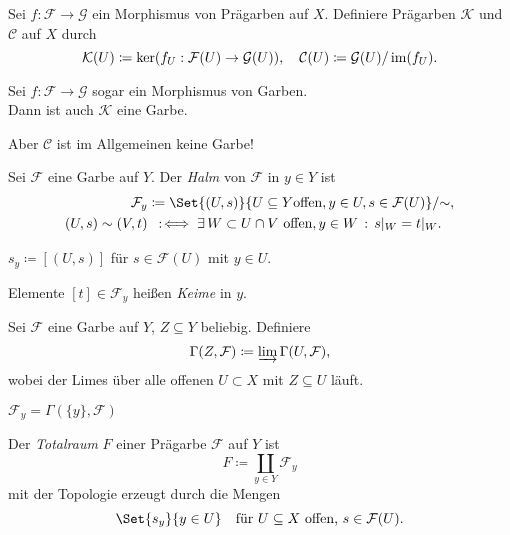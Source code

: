 \documentclass{cheat-sheet}
\newcommand{\Fais}{\mathcal{F}} %
\newcommand{\Garb}{\mathcal{G}} %
\begin{document}
\begin{defn}
  Sei $f : \Fais \to \Garb$ ein Morphismus von Prägarben auf $X$. Definiere Prägarben $\mathcal{K}$ und $\mathcal{C}$ auf $X$ durch
  \[
    \mathcal{K}(U) \coloneqq \ker (f_U : \Fais(U) \to \Garb(U)), \quad
    \mathcal{C}(U) \coloneqq \Garb(U) / \im (f_U).
  \]
\end{defn}

\begin{prop}
  Sei $f : \Fais \to \Garb$ sogar ein Morphismus von Garben. \\
  Dann ist auch $\mathcal{K}$ eine Garbe.
\end{prop}

\begin{acht}
  Aber $\mathcal{C}$ ist im Allgemeinen keine Garbe!
\end{acht}


\begin{defn}
  Sei $\Fais$ eine Garbe auf $Y$. Der \emph{Halm} von $\Fais$ in $y \in Y$ ist
  \begin{align*}
    \Fais_y & \coloneqq \Set{(U, s)}{U \subseteq Y \text{offen}, y \in U, s \in \Fais(U)} / {\sim}, \\
    (U, s) \sim (V, t) & \coloniff \ex{W \subset U \cap V \text{ offen}, y \in W} s|_W = t|_W.
  \end{align*}
\end{defn}

\begin{nota}
  $s_y \coloneqq [(U, s)]$ für $s \in \Fais(U)$ mit $y \in U$.
\end{nota}

\begin{sprech}
  Elemente $[t] \in \Fais_y$ heißen \emph{Keime} in $y$.
\end{sprech}

\begin{defn}
  Sei $\Fais$ eine Garbe auf $Y$, $Z \subseteq Y$ beliebig. Definiere
  \[ \Gamma(Z, \Fais) \coloneqq \varinjlim \Gamma(U, \Fais), \]
  wobei der Limes über alle offenen $U \subset X$ mit $Z \subseteq U$ läuft.
\end{defn}

\begin{beob}
  $\Fais_y = \Gamma(\{y\}, \Fais)$
\end{beob}

\begin{defn}
  Der \emph{Totalraum} $F$ einer Prägarbe $\Fais$ auf $Y$ ist
  \[ F \coloneqq \coprod_{y \in Y} \Fais_y \]
  mit der Topologie erzeugt durch die Mengen
  \[
    \Set{s_y}{ y \in U } \quad
    \text{für $U \subseteq X$ offen, $s \in \Fais(U)$.}
  \]
\end{defn}
\end{document}
